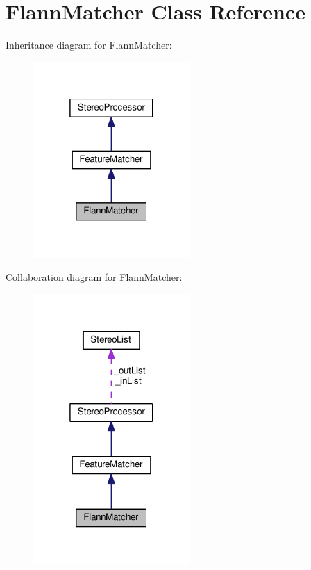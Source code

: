 \hypertarget{classFlannMatcher}{}\section{Flann\+Matcher Class Reference}
\label{classFlannMatcher}


Inheritance diagram for Flann\+Matcher\+:\nopagebreak
\begin{figure}[H]
\begin{center}
\leavevmode
\includegraphics[width=169pt]{classFlannMatcher__inherit__graph}
\end{center}
\end{figure}


Collaboration diagram for Flann\+Matcher\+:\nopagebreak
\begin{figure}[H]
\begin{center}
\leavevmode
\includegraphics[width=169pt]{classFlannMatcher__coll__graph}
\end{center}
\end{figure}
